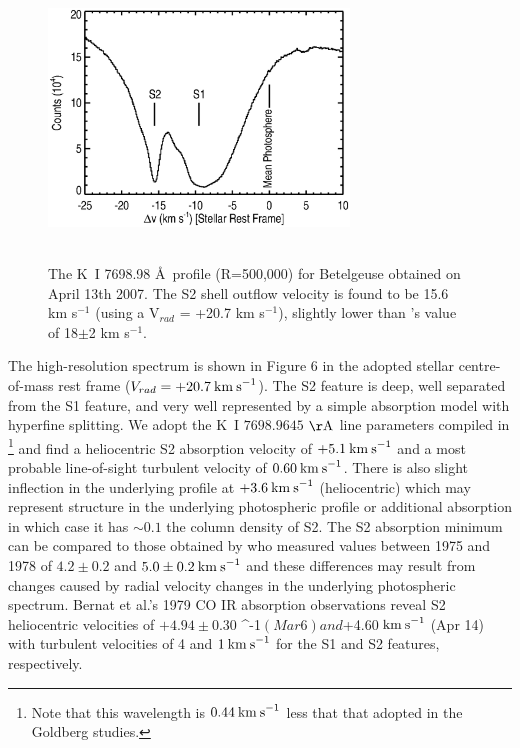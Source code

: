 \documentclass[apj]{emulateapj}
\begin{document}
\begin{figure}
\includegraphics[trim=40pt 0pt 50pt 0pt, width=8.0cm, height=7.5cm]{macdon.eps}
\caption{The K~I 7698.98 \AA \  profile (R=500,000) for Betelgeuse obtained on April 13th 2007. The S2 shell outflow velocity is found to be 15.6 km s${}^{-1}$ (using a V$_{rad}$ = +20.7 km s${}^{-1}$), slightly lower than \citeauthor{2002A&A...386.1009P}'s \citeyearpar{2002A&A...386.1009P} value of 18$\pm$2 km s${}^{-1}$.}
\label{fig:fig5}
\end{figure}

The high-resolution spectrum is shown in Figure 6 in the adopted stellar centre-of-mass rest frame ($V_{rad}=+20.7\>{\rm km\>s}^{-1}$). The S2 feature is deep, well separated from the S1 feature, and very well represented by a simple absorption model with hyperfine splitting. We adopt the K~I $7698.9645$ $\rm{\AA}$ line parameters compiled in \cite{2003ApJS..149..205M}\footnote{Note that this wavelength is $0.44\>{\rm km\>s}^{-1}$ less that that adopted in the Goldberg studies.} and find a heliocentric S2 absorption velocity of $+5.1\>{\rm km\>s}^{-1}$ and a most probable line-of-sight turbulent velocity of $0.60\>{\rm km\>s}^{-1}$. There is also slight inflection in the underlying profile at $+3.6\>{\rm km\>s}^{-1}$ (heliocentric) which may represent structure in the underlying photospheric profile or additional absorption in which case it has $\sim 0.1$ the column density of S2.  The S2 absorption minimum can be compared to those obtained by \citet[Fig 7]{1979QJRAS..20..361G} who measured values between 1975 and 1978 of $4.2\pm 0.2$ and $5.0\pm 0.2 \>{\rm km\>s}^{-1}$ and these differences may result from changes caused by radial velocity changes in the underlying photospheric spectrum. Bernat et al.'s 1979 CO IR absorption observations reveal S2 heliocentric velocities of $+4.94\pm 0.30$ ^{-1}$ (Mar 6) and $+4.60$ \>{\rm km\>s}^{-1}$ (Apr 14) with turbulent velocities of 4 and $1\>{\rm km\>s}^{-1}$ for the S1 and S2 features, respectively.
\end{document}
